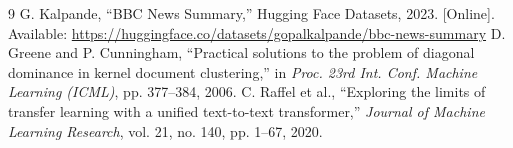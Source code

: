 \documentclass[conference,a4paper]{IEEEtran}
\begin{document}
\begin{thebibliography}{9}
 G. Kalpande, ``BBC News Summary,'' Hugging Face Datasets, 2023. [Online]. Available: \url{https://huggingface.co/datasets/gopalkalpande/bbc-news-summary}
 D. Greene and P. Cunningham, ``Practical solutions to the problem of diagonal dominance in kernel document clustering,'' in \textit{Proc. 23rd Int. Conf. Machine Learning (ICML)}, pp. 377--384, 2006.
 C. Raffel et al., ``Exploring the limits of transfer learning with a unified text-to-text transformer,'' \textit{Journal of Machine Learning Research}, vol. 21, no. 140, pp. 1--67, 2020.
\end{thebibliography}
\end{document}
